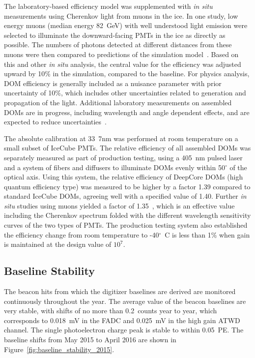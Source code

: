 The laboratory-based efficiency model was supplemented with \textit{in situ} measurements using Cherenkov light from muons in the ice.  In one study, low energy muons (median energy 82~GeV) with well understood light emission were selected to illuminate the downward-facing PMTs in the ice as directly as possible. The numbers of photons detected at different distances from these muons were then compared to predictions of the simulation model~\cite{IC3:ereco}.  Based on this and other \textit{in situ}  analysis, the central value for the efficiency was adjusted upward by 10\% in the simulation, compared to the baseline.  For physics analysis, DOM efficiency is generally included as a nuisance parameter with prior uncertainty of 10\%,  which includes other uncertainties related to generation and propagation of the light. Additional laboratory measurements on assembled DOMs are in progress, including wavelength and angle dependent effects, and are expected to reduce uncertainties~\cite{ICECUBE:DOMEFF}.

The absolute calibration at 33~7nm was performed at room temperature
on a small subset of IceCube PMTs. The relative efficiency of all
assembled DOMs was separately measured as part of production testing,
using a 405~nm pulsed laser and a system of fibers and diffusers to
illuminate DOMs evenly within 50$^{\circ}$ of the optical axis.  Using
this system, the relative efficiency of DeepCore DOMs (high quantum
efficiency type) was measured to be higher by a factor 1.39 compared
to standard IceCube DOMs, agreeing well with a specified value of
1.40. Further \textit{in situ}  studies using muons yielded a factor of
1.35~\cite{ICECUBE:DC}, which is an effective value including the
Cherenkov spectrum folded with the different wavelength sensitivity
curves of the two types of PMTs.  The production testing system also
established the efficiency change from room temperature to
-40$^{\circ}$~C is less than 1\% when gain is maintained at the design value of $10^7$.  

\subsection{Baseline Stability}

The beacon hits from which the digitizer baselines are derived are
monitored continuously throughout the year. The average value of the
beacon baselines are very stable, with shifts of no more than
0.2~counts year to year, which corresponds to 0.018~mV in the FADC and
0.025~mV in the high gain ATWD channel. The single photoelectron
charge peak is stable to within 0.05~PE. The baseline shifts from May
2015 to April 2016 are shown in
Figure~\ref{fig:baseline_stability_2015}. 

